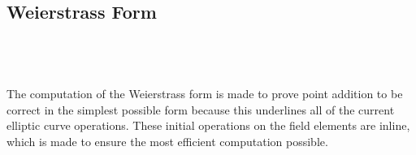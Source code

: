 \documentclass{article}
\begin{document}
\subsection{Weierstrass Form}
\noindent{}\\\\\\
The computation of the Weierstrass form is made to prove point addition to be correct in the simplest possible form because this underlines all of the current elliptic curve operations. These initial operations on the field elements are inline, which is made to ensure the most efficient computation possible.
\end{document}
